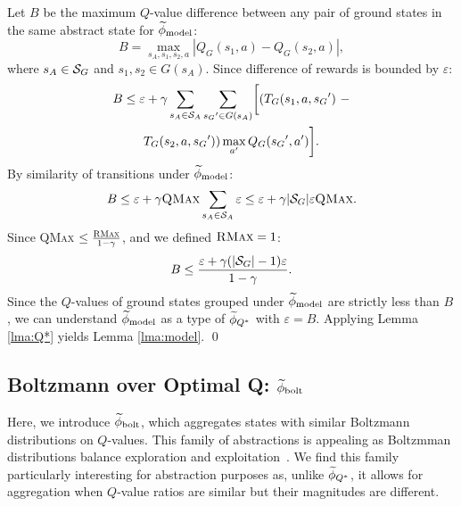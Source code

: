 Let $B$ be the maximum $Q$-value difference between any pair of ground states in the same abstract state for $\widetilde \phi_{\text{model}}$:
\begin{equation*}
B = \max_{s_A, s_1, s_2, a}  |Q_G(s_1, a) - Q_G(s_2, a)|,
\end{equation*}
where $s_A \in \mathcal{S}_G$ and $s_1, s_2 \in G(s_A)$. Since difference of rewards is bounded by $\varepsilon$:
\begin{multline*}
B\leq \varepsilon + \gamma \sum_{s_A \in \mathcal{S}_A}\sum_{{s_G}' \in G(s_A)} \biggl[(T_G(s_1, a, {s_G}')\ -\\ 
T_G(s_2, a, {s_G}')) \max_{a'}Q_G({s_G}', a') \biggr].
\end{multline*}
By similarity of transitions under $\widetilde \phi_{\text{model}}$:
\begin{align*}
B \leq \varepsilon + \gamma \textsc{QMax} \sum_{s_A \in \mathcal{S}_A} \varepsilon \leq \varepsilon + \gamma|\mathcal{S}_G|\varepsilon \textsc{QMax}.
\end{align*}
Since \textsc{QMax} $\leq \frac{\textsc{RMax}}{1-\gamma}$, and we defined $\textsc{RMax} = 1$:
\begin{equation*}
B \leq \frac{\varepsilon + \gamma(|\mathcal{S}_G| - 1) \varepsilon}{1-\gamma}.
\end{equation*}
Since the $Q$-values of ground states grouped under $\widetilde \phi_{\text{model}}$ are strictly less than $B$, we can understand $\widetilde \phi_{\text{model}}$ as a type of $\widetilde \phi_{Q^*}$ with $\varepsilon = B$. Applying Lemma \ref{lma:Q*} yields Lemma \ref{lma:model}.
\qed

\subsection{Boltzmann over Optimal Q: $\widetilde \phi_{\text{bolt}}$}
\label{sec:boltz}

Here, we introduce $\widetilde \phi_{\text{bolt}}$, which aggregates states with similar Boltzmann distributions on $Q$-values. This family of abstractions is appealing as Boltzmman distributions balance exploration and exploitation~\cite{sutton1998reinforcement}. We find this family particularly interesting for abstraction purposes as, unlike $\widetilde \phi_{Q^*}$, it allows for aggregation when $Q$-value ratios are similar but their magnitudes are different.

